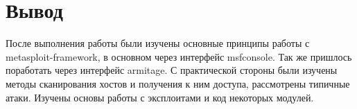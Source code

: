 \documentclass{article}
\begin{document}
 \section{Вывод}
 
 После выполнения работы были изучены основные принципы работы с metasploit-framework, в основном через интерфейс msfconsole. Так же пришлось поработать через интерфейс armitage. С практической стороны были изучены методы сканирования хостов и получения к ним доступа, рассмотрены типичные атаки. Изучены основы работы с эксплоитами и код некоторых модулей.
 
 
 
\end{document}

